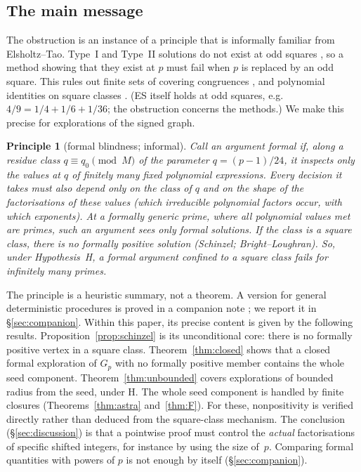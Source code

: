 \documentclass[11pt,reqno]{amsart}
\newtheorem*{principle}{Principle}
\theoremstyle{definition}
\begin{document}
\subsection{The main message}
The obstruction is an instance of a principle that is informally familiar
from Elsholtz--Tao.  Type~I and Type~II solutions do not exist at odd
squares \cite[Prop.~1.6]{ET}, so a method showing that they exist at $p$ must
fail when $p$ is replaced by an odd square.  This rules out finite sets of
covering congruences \cite[\S1, remark after Prop.~1.6, p.~6]{ET}, and
polynomial identities on square classes \cite[p.~8]{ET}.  (ES itself
holds at odd squares, e.g.\ $4/9=1/4+1/6+1/36$; the obstruction concerns
the methods.)  We make this precise for explorations of the signed graph.

\begin{principle}[formal blindness; informal]
Call an argument \emph{formal} if, along a residue class
$q\equiv q_0\pmod M$ of the parameter $q=(p-1)/24$, it inspects only the
values at $q$ of \emph{finitely many} fixed polynomial expressions.  Every
decision it takes must also depend only on the class of $q$ and on the
\emph{shape} of the factorisations of these values (which irreducible
polynomial factors occur, with which exponents).  At a \emph{formally
generic} prime, where all polynomial values met are primes, such an argument
sees only \emph{formal} solutions.  If the class is a square class, there is
no formally positive solution (Schinzel; Bright--Loughran).  So, under
Hypothesis~H, a formal argument confined to a square class fails for
infinitely many primes.
\end{principle}

The principle is a heuristic summary, not a theorem.  A version for
general deterministic procedures is proved in a companion note \cite{PS};
we report it in \S\ref{sec:companion}.  Within this paper, its precise
content is given by the following results.  Proposition~\ref{prop:schinzel} is its
unconditional core: there is no formally positive vertex in a square class.
Theorem~\ref{thm:closed} shows that a closed formal exploration of $G_p$
with no formally positive member contains the whole seed component.  Theorem~\ref{thm:unbounded} covers explorations of bounded radius
from the seed, under H.  The whole seed component is handled by finite
closures (Theorems~\ref{thm:astra} and~\ref{thm:F}).  For these,
nonpositivity is verified directly rather than deduced from the square-class
mechanism.  The conclusion
(\S\ref{sec:discussion}) is that a pointwise proof must control the
\emph{actual} factorisations of specific shifted integers, for instance by
using the size of~$p$.  Comparing formal quantities with powers of $p$ is
not enough by itself (\S\ref{sec:companion}).
\end{document}

